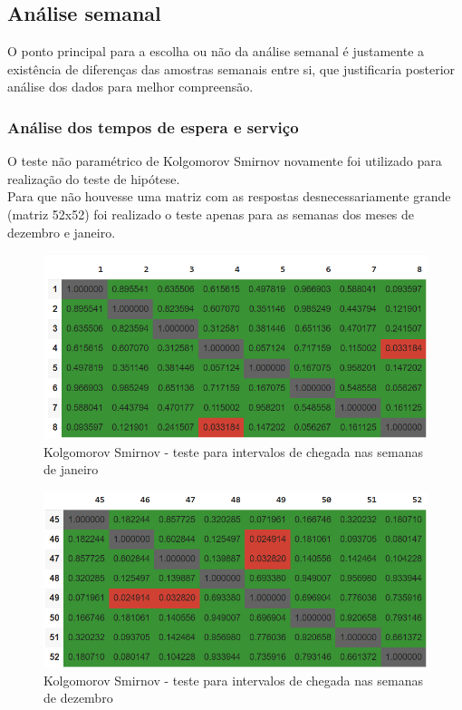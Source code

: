 \subsection{Análise semanal}
O ponto principal para a escolha ou não da análise semanal é justamente a existência de diferenças das amostras semanais entre si, que justificaria posterior análise dos dados para melhor compreensão.\\
\subsubsection{Análise dos tempos de espera e serviço}
O teste não paramétrico de Kolgomorov Smirnov novamente foi utilizado para realização do teste de hipótese.\\
Para que não houvesse uma matriz com as respostas desnecessariamente grande (matriz 52x52) foi realizado o teste apenas para as semanas dos meses de dezembro e janeiro.\\
\begin{center}
    \begin{figure}[H]
        \includegraphics{analise-de-dados/semanal/janas.png}
        \caption{Kolgomorov Smirnov - teste para intervalos de chegada nas semanas de janeiro}
        \label{fig: jan_as_img}
    \end{figure}
    \begin{figure}[H]
        \includegraphics{analise-de-dados/semanal/dezas.png}
        \caption{Kolgomorov Smirnov - teste para intervalos de chegada nas semanas de dezembro}
        \label{fig: dez_as_img}
    \end{figure}
\end{center}
